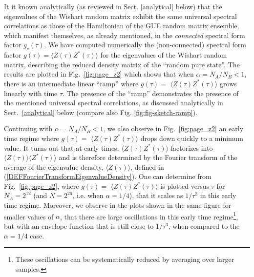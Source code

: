 \documentclass[aps,prb,preprint,onecolumn,amsmath,amssymb,superscriptaddress,eqsecnum,floatfix,scrartcl]{revtex4-1}
\begin{document}
It it known analytically (as reviewed in Sect.
\ref{analytical} below)
 that the eigenvalues of the Wishart random matrix
exhibit the same universal spectral correlations as
those of the Hamiltonian of the GUE  random matrix ensemble, which manifest themselves, as already
mentioned, in the {\it connected} spectral form factor $g_c(\tau)$.
We have computed numerically the (non-connected)
spectral form factor $ g(\tau)=$$\langle Z(\tau)Z^*(\tau)\rangle$ for the eigenvalues of
the 
Wishart random matrix, describing the reduced density matrix of the ``random pure state''. 
The results are plotted  in Fig.~\ref{fig:page_z2}
which shows that
when $\alpha= N_A/N_B<1$, there is 
an intermediate  linear ``ramp'' where $g(\tau)=$ $\langle Z(\tau)Z^*(\tau)\rangle$ grows linearly with
 time $\tau$.
The presence of the ``ramp''
demonstrates the presence of the mentioned universal spectral correlations, as discussed
 analytically  in Sect.~\ref{analytical} below (compare also Fig. \ref{fig:fig-sketch-ramp}).


Continuing with $\alpha=N_A/N_B <1$,
we also observe  in Fig.~\ref{fig:page_z2}
an early time regime where $g(\tau)=$ $\langle Z(\tau)Z^*(\tau)\rangle$ drops down quickly to a minimum value.
It turns out 
that at early times,
$\langle Z(\tau)Z^*(\tau)\rangle$  
factorizes into $\langle Z(\tau)\rangle\langle Z^*(\tau)\rangle$ and is  therefore  determined by the Fourier 
transform  of the 
average of the eigenvalue density, $\langle Z(\tau)\rangle$, defined in (\ref{DEFFourierTransformEigenvalueDensity}).
One  can determine from
Fig.~\ref{fig:page_z2}, 
where
$g(\tau)=$ $\langle Z(\tau)Z^*(\tau)\rangle$ is plotted versus $\tau$ for
 $N_A=2^{12}$ (and $N=2^{26}$, i.e. when  $\alpha=1/4$), 
that it scales as $1/\tau^3$ in this early time regime. 
Moreover, we observe in  the plots 
shown in the same figure  for smaller values of $\alpha$,
that
there are large oscillations in 
this  early time regime\footnote{These oscillations can be systematically reduced by averaging over larger samples.}, 
but  with an envelope function  that is  still close to $1/\tau^3$, when  compared to the $\alpha=1/4$ case.
\end{document}
